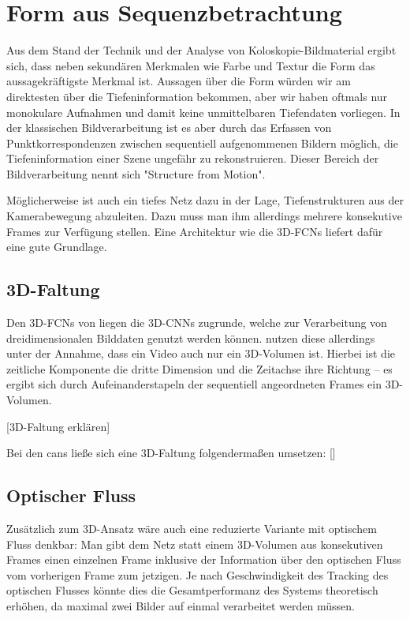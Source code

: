 \section{Form aus Sequenzbetrachtung}

Aus dem Stand der Technik und der Analyse von Koloskopie-Bildmaterial ergibt sich, dass neben sekundären Merkmalen wie Farbe und Textur die Form das aussagekräftigste Merkmal ist.
Aussagen über die Form würden wir am direktesten über die Tiefeninformation bekommen, aber wir haben oftmals nur monokulare Aufnahmen und damit keine unmittelbaren Tiefendaten vorliegen.
In der klassischen Bildverarbeitung ist es aber durch das Erfassen von Punktkorrespondenzen zwischen sequentiell aufgenommenen Bildern möglich, die Tiefeninformation einer Szene ungefähr zu rekonstruieren.
Dieser Bereich der Bildverarbeitung nennt sich "Structure from Motion".

Möglicherweise ist auch ein tiefes Netz dazu in der Lage, Tiefenstrukturen aus der Kamerabewegung abzuleiten.
Dazu muss man ihm allerdings mehrere konsekutive Frames zur Verfügung stellen.
Eine Architektur wie die 3D-FCNs liefert dafür eine gute Grundlage.

\subsection{3D-Faltung}

Den 3D-FCNs von \cite{Lequan.2017} liegen die 3D-CNNs zugrunde, welche zur Verarbeitung von dreidimensionalen Bilddaten genutzt werden können.
\citeauthor{Lequan.2017} nutzen diese allerdings unter der Annahme, dass ein Video auch nur ein 3D-Volumen ist.
Hierbei ist die zeitliche Komponente die dritte Dimension und die Zeitachse ihre Richtung -- es ergibt sich durch Aufeinanderstapeln der sequentiell angeordneten Frames ein 3D-Volumen.

[3D-Faltung erklären]

Bei den \glspl{can} ließe sich eine 3D-Faltung folgendermaßen umsetzen:
[]

\subsection{Optischer Fluss}

Zusätzlich zum 3D-Ansatz wäre auch eine reduzierte Variante mit optischem Fluss denkbar:
Man gibt dem Netz statt einem 3D-Volumen aus konsekutiven Frames einen einzelnen Frame inklusive der Information über den optischen Fluss vom vorherigen Frame zum jetzigen.
Je nach Geschwindigkeit des Tracking des optischen Flusses könnte dies die Gesamtperformanz des Systems theoretisch erhöhen, da maximal zwei Bilder auf einmal verarbeitet werden müssen.

